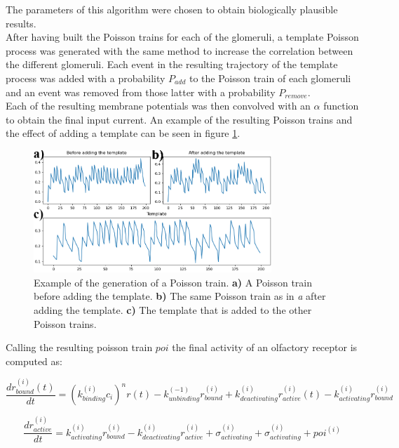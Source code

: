     

    The parameters of this algorithm were chosen to obtain biologically plausible results.\\
    After having built the Poisson trains for each of the glomeruli, a template Poisson process was generated with the same method to increase the correlation between the different glomeruli.
    Each event in the resulting trajectory of the template process was added with a probability $P_{add}$ to the Poisson train of each glomeruli and an event was removed from those latter with a probability $P_{remove}$.\\
    Each of the resulting membrane potentials was then convolved with an $\alpha$ function to obtain the final input current.
    An example of the resulting Poisson trains and the effect of adding a template can be seen in figure \ref{fig:poisson-trains}.

    \begin{figure}
      \centering
      \includegraphics[width=0.8\textwidth]{poisson_train_example}
      \caption{Example of the generation of a Poisson train. \textbf{a)} A Poisson train before adding the template. \textbf{b)} The same Poisson train as in \textit{a} after adding the template. \textbf{c)} The template that is added to the other Poisson trains.}
      \label{fig:poisson-trains}
    \end{figure}

    Calling the resulting poisson train $poi$ the final activity of an olfactory receptor is computed as:

    \begin{equation}
      \frac{dr^{(i)}_{bound}(t)}{dt} = (k_{binding}^{(i)}c_i)^nr(t) - k_{unbinding}^{(-1)}r^{(i)}_{bound} + k_{deactivating}^{(i)}r_{active}^{(i)}(t) - k_{activating}^{(i)}r^{(i)}_{bound}
    \end{equation}

    \begin{equation}
      \frac{dr_{active}^{(i)}}{dt} = k_{activating}^{(i)} r^{(i)}_{bound} - k_{deactivating}^{(i)}r_{active}^{(i)} + \sigma_{activating}^{(i)} + \sigma_{activating}^{(i)} + poi^{(i)}
    \end{equation}

